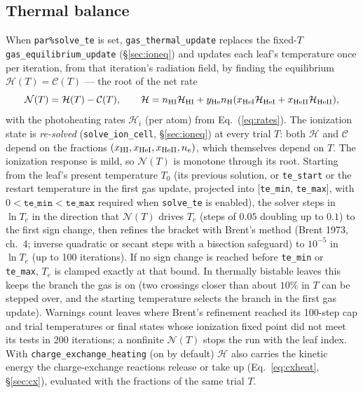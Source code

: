 \documentclass[english,a4paper]{my_memo}
\newcommand{\code}[1]{\texttt{#1}}
\begin{document}
\subsection{Thermal balance}
\label{sec:thermal}
When \code{par\%solve\_te} is set, \code{gas\_thermal\_update} replaces
the fixed-$T$ \code{gas\_equilibrium\_update} (\S\ref{sec:ioneq}) and
updates each leaf's temperature once per iteration, from that iteration's
radiation field, by finding the equilibrium
$\mathcal{H}(T) = \mathcal{C}(T)$ --- the root of the net rate
\begin{equation}
  \mathcal{N}(T) = \mathcal{H}(T) - \mathcal{C}(T),\qquad
  \mathcal{H} = n_{\rm HI}\mathcal{H}_{\rm HI} + y_{\rm He} n_{\rm H}
  (x_{\rm HeI}\mathcal{H}_{\rm HeI} + x_{\rm HeII}\mathcal{H}_{\rm HeII}),
  \label{eq:netrate}
\end{equation}
with the photoheating rates $\mathcal{H}_i$ (per atom) from
Eq.~(\ref{eq:rates}).  The ionization state is \emph{re-solved}
(\code{solve\_ion\_cell}, \S\ref{sec:ioneq}) at every trial $T$: both
$\mathcal{H}$ and $\mathcal{C}$ depend on the fractions
$(x_{\rm HI}, x_{\rm HeI}, x_{\rm HeII}, n_e)$, which themselves depend on
$T$.  The ionization response is mild, so $\mathcal{N}(T)$ is monotone
through its root. Starting from the leaf's present temperature $T_0$ (its
previous solution, or \code{te\_start} or the restart temperature in the
first gas update, projected into [\code{te\_min}, \code{te\_max}], with
$0 < \code{te\_min} < \code{te\_max}$ required when \code{solve\_te} is
enabled), the solver steps in $\ln T_e$ in the direction that
$\mathcal{N}(T)$ drives $T_e$ (steps of $0.05$ doubling up to $0.1$) to
the first sign change, then refines the bracket with Brent's method
(Brent 1973, ch.\ 4; inverse quadratic or secant steps with a bisection
safeguard) to $10^{-5}$ in $\ln T_e$ (up to 100 iterations). If no sign
change is reached before \code{te\_min} or \code{te\_max}, $T_e$ is
clamped exactly at that bound. In thermally bistable leaves this keeps
the branch the gas is on (two crossings closer than about $10\%$ in $T$
can be stepped over, and the starting temperature selects the branch in
the first gas update). Warnings count leaves where Brent's refinement
reached its 100-step cap and trial temperatures or final states whose
ionization fixed point did not meet its tests in 200 iterations; a
nonfinite $\mathcal{N}(T)$ stops the run with the leaf index. With
\code{charge\_exchange\_heating} (on by default)
$\mathcal{H}$ also carries the kinetic energy the charge-exchange reactions
release or take up (Eq.~\ref{eq:cxheat}, \S\ref{sec:cx}), evaluated with the
fractions of the same trial $T$.
\end{document}
